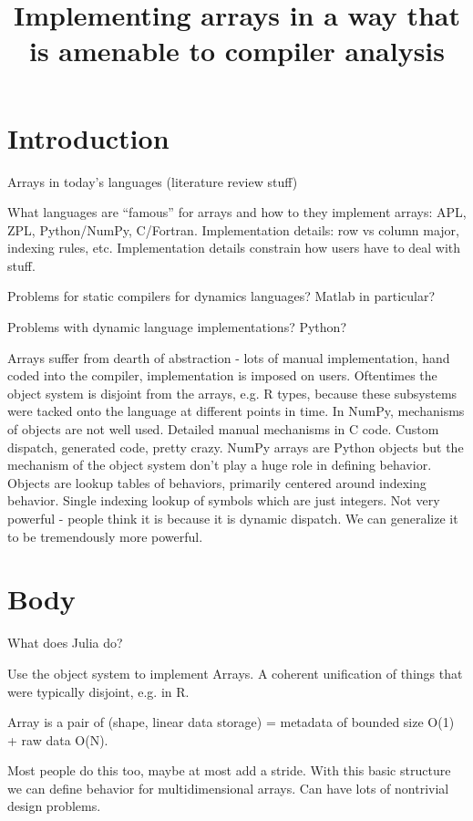 \documentclass[english]{article}
\begin{document}
\title{Implementing arrays in a way that is amenable to compiler analysis}

\maketitle

\section{Introduction}

Arrays in today's languages (literature review stuff)

What languages are ``famous'' for arrays and how to they implement
arrays: APL, ZPL, Python/NumPy, C/Fortran. Implementation details:
row vs column major, indexing rules, etc. Implementation details constrain
how users have to deal with stuff.

Problems for static compilers for dynamics languages? Matlab in particular?

Problems with dynamic language implementations? Python?

Arrays suffer from dearth of abstraction - lots of manual implementation,
hand coded into the compiler, implementation is imposed on users.
Oftentimes the object system is disjoint from the arrays, e.g. R types,
because these subsystems were tacked onto the language at different
points in time. In NumPy, mechanisms of objects are not well used.
Detailed manual mechanisms in C code. Custom dispatch, generated code,
pretty crazy. NumPy arrays are Python objects but the mechanism of
the object system don't play a huge role in defining behavior. Objects
are lookup tables of behaviors, primarily centered around indexing
behavior. Single indexing lookup of symbols which are just integers.
Not very powerful - people think it is because it is dynamic dispatch.
We can generalize it to be tremendously more powerful.


\section{Body}

What does Julia do?

Use the object system to implement Arrays. A coherent unification
of things that were typically disjoint, e.g. in R. 

Array is a pair of (shape, linear data storage) = metadata of bounded
size O(1) + raw data O(N).

Most people do this too, maybe at most add a stride. With this basic
structure we can define behavior for multidimensional arrays. Can have
lots of nontrivial design problems.
\end{document}
